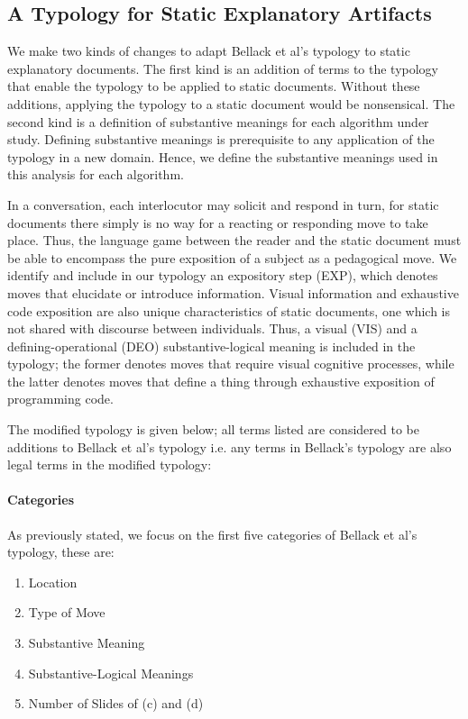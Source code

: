 \documentclass[conference]{IEEEtran}
\begin{document}
\subsection{A Typology for Static Explanatory Artifacts}
We make two kinds of changes to adapt Bellack et al's typology to static
explanatory documents. The first kind is an addition of terms to the typology
that enable the typology to be applied to static documents. Without these additions,
applying the typology to a static document would be nonsensical. The second kind
is a definition of substantive meanings for each algorithm under study.
Defining substantive meanings is prerequisite to any application of the typology
in a new domain. Hence, we define the substantive meanings used in this analysis
for each algorithm.

In a conversation, each interlocutor may solicit and respond in turn, for static
documents there simply is no way for a reacting or responding move to take
place. Thus, the language game between the reader and the static document must
be able to encompass the pure exposition of a subject as a pedagogical move. We
identify and include in our typology an expository step (EXP), which denotes
moves that elucidate or introduce information. Visual information and exhaustive
code exposition are also unique characteristics of static documents, one which
is not shared with discourse between individuals. Thus, a visual (VIS) and a
defining-operational (DEO) substantive-logical meaning is included in the
typology; the former denotes moves that require visual cognitive processes,
while the latter denotes moves that define a thing through exhaustive exposition
of programming code.

The modified typology is given below; all terms listed are considered to be additions to
Bellack et al's typology i.e. any terms in Bellack's typology are also
legal terms in the modified typology:

\paragraph{Categories}
As previously stated, we focus on the first five categories of Bellack et al's
typology, these are:
\begin{enumerate}
  \item Location
  \item Type of Move
  \item Substantive Meaning
  \item Substantive-Logical Meanings
  \item Number of Slides of (c) and (d)
\end{enumerate}
\end{document}
